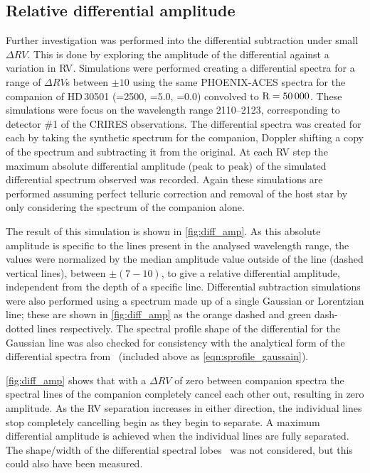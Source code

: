 

\subsection{Relative differential amplitude}
\label{subsec:relative_differential_amplitue}
Further investigation was performed into the differential subtraction under small \(\Delta {RV}\).
This is done by exploring the amplitude of the differential against a variation in {RV}.
Simulations were performed creating a differential spectra for a range of \(\Delta {RV}\)s between \(\pm10\)\kmps{} using the same {PHOENIX-ACES} spectra for the companion of {HD\,30501} (\Teff{}=2500\K{}, \Logg{}=5.0, \feh{}=0.0) convolved to \(\textrm{R}=50\,000\).
These simulations were focus on the wavelength range 2110--2123\nm{}, corresponding to detector \#1 of the {CRIRES} observations.
The differential spectra was created for each by taking the synthetic spectrum for the companion, Doppler shifting a copy of the spectrum and subtracting it from the original.
At each {RV} step the maximum absolute differential amplitude (peak to peak) of the simulated differential spectrum observed was recorded.
Again these simulations are performed assuming perfect telluric correction and removal of the host star by only considering the spectrum of the companion alone.

The result of this simulation is shown in \cref{fig:diff_amp}.
As this absolute amplitude is specific to the lines present in the analysed wavelength range, the values were normalized by the median amplitude value outside of the line {\fwhm} (dashed vertical lines), between \(\pm(7-10)\)\kmps{}, to give a relative differential amplitude, independent from the depth of a specific line.
Differential subtraction simulations were also performed using a spectrum made up of a single Gaussian or Lorentzian line; these are shown in \cref{fig:diff_amp} as the orange dashed and green dash-dotted lines respectively.
The spectral profile shape of the differential for the Gaussian line was also checked for consistency with the analytical form of the differential spectra from~\citet[][Equation~A.1]{ferluga_separating_1997} (included above as \cref{eqn:sprofile_gaussain}).

\cref{fig:diff_amp} shows that with a \(\Delta {RV}\) of zero between companion spectra the spectral lines of the companion completely cancel each other out, resulting in zero amplitude.
As the {RV} separation increases in either direction, the individual lines stop completely cancelling begin as they begin to separate.
A maximum differential amplitude is achieved when the individual lines are fully separated.
The shape/width of the differential spectral lobes~\citet[e.g.][eqn.~A.1]{ferluga_separating_1997} was not considered, but this could also have been measured.

